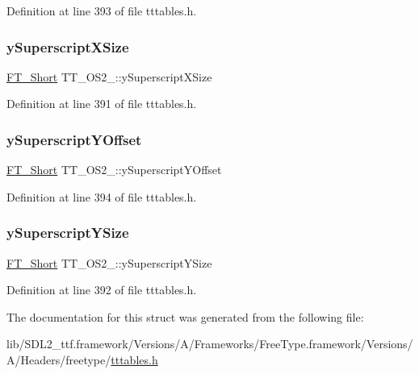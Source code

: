 Definition at line 393 of file tttables.\+h.

\mbox{\label{struct_t_t___o_s2___a8611c9afc2283cfeeedda236085e86ca}} 
\subsubsection{\texorpdfstring{ySuperscriptXSize}{ySuperscriptXSize}}
{\footnotesize\ttfamily \mbox{\hyperlink{fttypes_8h_aa7279be89046a2563cd3d4d6651fbdcf}{F\+T\+\_\+\+Short}} T\+T\+\_\+\+O\+S2\+\_\+\+::y\+Superscript\+X\+Size}



Definition at line 391 of file tttables.\+h.

\mbox{\label{struct_t_t___o_s2___ab425c51eaf29a0ec441ec57439003c01}} 
\subsubsection{\texorpdfstring{ySuperscriptYOffset}{ySuperscriptYOffset}}
{\footnotesize\ttfamily \mbox{\hyperlink{fttypes_8h_aa7279be89046a2563cd3d4d6651fbdcf}{F\+T\+\_\+\+Short}} T\+T\+\_\+\+O\+S2\+\_\+\+::y\+Superscript\+Y\+Offset}



Definition at line 394 of file tttables.\+h.

\mbox{\label{struct_t_t___o_s2___a272867f1270ddca538b082d190715012}} 
\subsubsection{\texorpdfstring{ySuperscriptYSize}{ySuperscriptYSize}}
{\footnotesize\ttfamily \mbox{\hyperlink{fttypes_8h_aa7279be89046a2563cd3d4d6651fbdcf}{F\+T\+\_\+\+Short}} T\+T\+\_\+\+O\+S2\+\_\+\+::y\+Superscript\+Y\+Size}



Definition at line 392 of file tttables.\+h.



The documentation for this struct was generated from the following file\+:\begin{DoxyCompactItemize}
\item 
lib/\+S\+D\+L2\+\_\+ttf.\+framework/\+Versions/\+A/\+Frameworks/\+Free\+Type.\+framework/\+Versions/\+A/\+Headers/freetype/\mbox{\hyperlink{tttables_8h}{tttables.\+h}}\end{DoxyCompactItemize}
